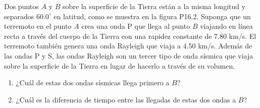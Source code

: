 \item Dos puntos $A$ y $B$ sobre la superficie de la Tierra están a la misma longitud y separados $60.0^\circ$ en latitud, como se muestra en la figura P16.2. Suponga que un terremoto en el punto $A$ crea una onda P que llega al punto $B$ viajando en línea recta a través del cuerpo de la Tierra con una rapidez constante de 7.80 km/s. El terremoto también genera una onda Rayleigh que viaja a 4.50 km/s. Además de las ondas P y S, las ondas Rayleigh son un tercer tipo de onda sísmica que viaja sobre la superficie de la Tierra en lugar de hacerlo a través de su volumen.
\begin{enumerate}
    \item ¿Cuál de estas dos ondas sísmicas llega primero a $B$?
    \item ¿Cuál es la diferencia de tiempo entre las llegadas de estas dos ondas a $B$?
\end{enumerate}